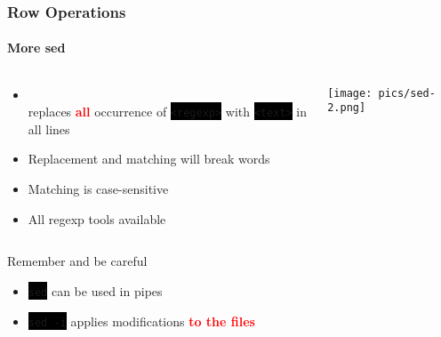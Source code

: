 \documentclass[unknownkeysallowed, 10pt, a4 paper, handout]{beamer}
\newcommand{\focus}[1]{\textbf{\textcolor{red}{#1}}}
\newcommand{\code}[1]{\colorbox{black}{\color{green}\texttt{#1}}}
\newcommand{\codeine}[1]{
\colorbox{black}{\color{green} \BUseVerbatim{#1} }
}
\begin{document}
\begin{frame}[fragile=singleslide]
  \frametitle{Row Operations}
  \framesubtitle{More sed}

  \begin{columns}
    \begin{column}{0.70\textwidth}
      \begin{itemize}
        \begin{SaveVerbatim}{myverb}
sed 's/<regexp>/<text>/g' <files>
        \end{SaveVerbatim}
        \item \codeine{myverb} \\
          replaces \focus{all} occurrence of \code{<regexp>} with
          \code{<text>} in all lines
      \end{itemize}
      \begin{exampleblock}{}
        \begin{itemize}
          \item Replacement and matching will break words
          \item Matching is case-sensitive
          \item All regexp tools available
        \end{itemize}
      \end{exampleblock}
    \end{column}
    \begin{column}{0.30\textwidth}
      \texttt{[image: pics/sed-2.png]}
    \end{column}
  \end{columns}

  \begin{alertblock}{Remember and be careful}
    \begin{itemize}
      \item \code{sed} can be used in pipes
      \item \code{sed -i} applies modifications \focus{to the files}
    \end{itemize}
  \end{alertblock}
\end{frame}
\end{document}

